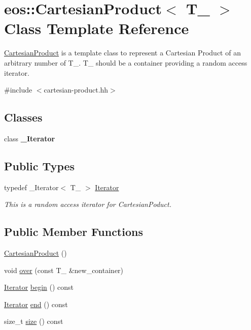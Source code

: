 \hypertarget{classeos_1_1CartesianProduct}{
\section{eos::CartesianProduct$<$ T\_\- $>$ Class Template Reference}
\label{classeos_1_1CartesianProduct}
}


\hyperlink{classeos_1_1CartesianProduct}{CartesianProduct} is a template class to represent a Cartesian Product of an arbitrary number of T\_\-. T\_\- should be a container providing a random access iterator.  


{\ttfamily \#include $<$cartesian-\/product.hh$>$}\subsection*{Classes}
\begin{DoxyCompactItemize}
\item 
class {\bfseries \_\-Iterator}
\end{DoxyCompactItemize}
\subsection*{Public Types}
\begin{DoxyCompactItemize}
\item 
typedef \_\-Iterator$<$ T\_\- $>$ \hyperlink{classeos_1_1CartesianProduct_aa2ff28e4a1845a8ee763a877a8cd4346}{Iterator}
\begin{DoxyCompactList}\small\item\em This is a random access iterator for CartesianPoduct. \item\end{DoxyCompactList}\end{DoxyCompactItemize}
\subsection*{Public Member Functions}
\begin{DoxyCompactItemize}
\item 
\hyperlink{classeos_1_1CartesianProduct_ab31950cf7edf8589a6e86a81b36d9b4d}{CartesianProduct} ()
\item 
void \hyperlink{classeos_1_1CartesianProduct_adef1565dbec35aab631423ade5b1baf0}{over} (const T\_\- \&new\_\-container)
\item 
\hyperlink{classeos_1_1CartesianProduct_aa2ff28e4a1845a8ee763a877a8cd4346}{Iterator} \hyperlink{classeos_1_1CartesianProduct_a34cc259ef3e5c9e0773e816449787abd}{begin} () const 
\item 
\hyperlink{classeos_1_1CartesianProduct_aa2ff28e4a1845a8ee763a877a8cd4346}{Iterator} \hyperlink{classeos_1_1CartesianProduct_a7c37fe657fc7d312ae482ab581d3392f}{end} () const 
\item 
size\_\-t \hyperlink{classeos_1_1CartesianProduct_a5825cf1120b0464a9ce21c65239f0c9b}{size} () const 
\end{DoxyCompactItemize}


